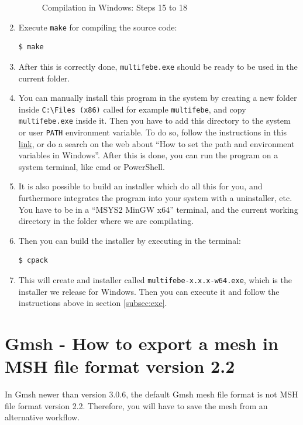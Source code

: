 \documentclass[a4paper,fleqn]{book}
\begin{document}
\begin{enumerate}
\begin{figure}[h]
  \caption{Compilation in Windows: Steps 15 to 18}
  \label{fig:windows_compilation_013}
  \end{figure} 
  \item Execute \texttt{make} for compiling the source code:
\begin{Verbatim}[frame=single, fontsize=\small]
$ make
\end{Verbatim}
  \item After this is correctly done, \texttt{multifebe.exe} should be ready to be used in the current folder.  
  \item You can manually install this program in the system by creating a new folder inside \texttt{C:\textbackslash Files (x86)} called for example \texttt{multifebe}, and copy \texttt{multifebe.exe} inside it. Then you have to add this directory to the system or user \texttt{PATH} environment variable. To do so, follow the instructions in this \href{https://www.computerhope.com/issues/ch000549.htm}{link}, or do a search on the web about ``How to set the path and environment variables in Windows''. After this is done, you can run the program on a system terminal, like cmd or PowerShell.
  \item It is also possible to build an installer which do all this for you, and furthermore integrates the program into your system with a uninstaller, etc. You have to be in a ``MSYS2  MinGW x64'' terminal, and the current working directory in the folder where we are compilating. 
  \item Then you can build the installer by executing in the terminal:
\begin{Verbatim}[frame=single, fontsize=\small]
$ cpack
\end{Verbatim}
  \item This will create and installer called \texttt{multifebe-x.x.x-w64.exe}, which is the installer we release for Windows. Then you can execute it and follow the instructions above in section \ref{subsec:exe}.
\end{enumerate}

\chapter{Gmsh - How to export a mesh in MSH file format version 2.2}

\label{ap:gmsh_export}

In Gmsh newer than version 3.0.6, the default Gmsh mesh file format is not MSH file format version 2.2. Therefore, you will have to save the mesh from an alternative workflow.
\end{document}
